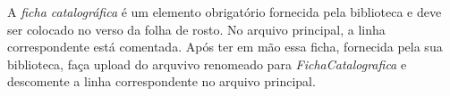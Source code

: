 
A \textit{ficha catalográfica} é um elemento obrigatório fornecida pela biblioteca e deve ser colocado no verso da folha de rosto. No arquivo principal, a linha correspondente está comentada. Após ter em mão essa ficha, fornecida pela sua biblioteca, faça upload do arquvivo renomeado para \textit{{\ttfamily FichaCatalografica}} e descomente a linha correspondente no arquivo principal. 



